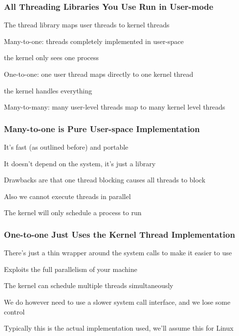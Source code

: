   \begin{frame}
    \frametitle{All Threading Libraries You Use Run in User-mode}

    The thread library maps user threads to kernel threads

    \vspace{2em}

    Many-to-one: threads completely implemented in user-space

    \hspace{2em} the kernel only sees one process

    \vspace{2em}

    One-to-one: one user thread maps directly to one kernel thread

    \hspace{2em} the kernel handles everything

    \vspace{2em}

    Many-to-many: many user-level threads map to many kernel level threads
  \end{frame}

  \begin{frame}
    \frametitle{Many-to-one is Pure User-space Implementation}

    It's fast (as outlined before) and portable

    \hspace{2em} It doesn't depend on the system, it's just a library

    \vspace{2em}

    Drawbacks are that one thread blocking causes all threads to block

    \hspace{2em} Also we cannot execute threads in parallel

    \hspace{4em} The kernel will only schedule a process to run
  \end{frame}

  \begin{frame}
    \frametitle{One-to-one Just Uses the Kernel Thread Implementation}

    There's just a thin wrapper around the system calls to make it easier to use

    \vspace{2em}

    Exploits the full parallelism of your machine

    \hspace{2em} The kernel can schedule multiple threads simultaneously

    \vspace{2em}

    We do however need to use a slower system call interface, and we lose some
    control

    \vspace{4em}

    Typically this is the actual implementation used, we'll assume this for
    Linux
  \end{frame}

